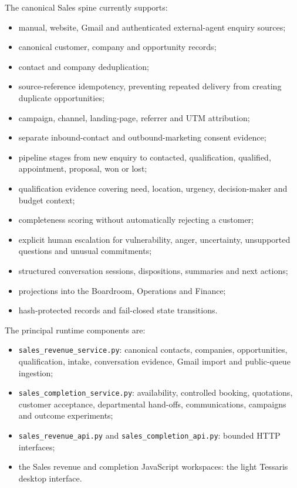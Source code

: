 The canonical Sales spine currently supports:

\begin{itemize}
  \item manual, website, Gmail and authenticated external-agent enquiry sources;
  \item canonical customer, company and opportunity records;
  \item contact and company deduplication;
  \item source-reference idempotency, preventing repeated delivery from creating duplicate opportunities;
  \item campaign, channel, landing-page, referrer and UTM attribution;
  \item separate inbound-contact and outbound-marketing consent evidence;
  \item pipeline stages from new enquiry to contacted, qualification, qualified, appointment, proposal, won or lost;
  \item qualification evidence covering need, location, urgency, decision-maker and budget context;
  \item completeness scoring without automatically rejecting a customer;
  \item explicit human escalation for vulnerability, anger, uncertainty, unsupported questions and unusual commitments;
  \item structured conversation sessions, dispositions, summaries and next actions;
  \item projections into the Boardroom, Operations and Finance;
  \item hash-protected records and fail-closed state transitions.
\end{itemize}

The principal runtime components are:

\begin{itemize}
  \item \texttt{sales\_revenue\_service.py}: canonical contacts, companies, opportunities, qualification, intake, conversation evidence, Gmail import and public-queue ingestion;
  \item \texttt{sales\_completion\_service.py}: availability, controlled booking, quotations, customer acceptance, departmental hand-offs, communications, campaigns and outcome experiments;
  \item \texttt{sales\_revenue\_api.py} and \texttt{sales\_completion\_api.py}: bounded HTTP interfaces;
  \item the Sales revenue and completion JavaScript workspaces: the light Tessaris desktop interface.
\end{itemize}

